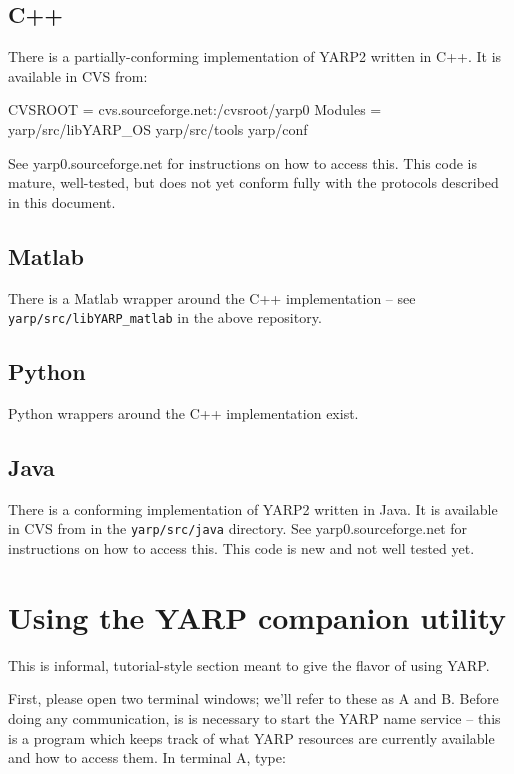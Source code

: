 \documentclass[a4]{article}
\begin{document}
\subsection{C++}

There is a partially-conforming implementation of YARP2 written
in C++.  It is available in CVS from:
\begin{code}
  CVSROOT = cvs.sourceforge.net:/cvsroot/yarp0
  Modules = yarp/src/libYARP_OS yarp/src/tools yarp/conf
\end{code}
See yarp0.sourceforge.net for instructions on how to access this.
This code is mature, well-tested, but does not yet conform fully
with the protocols described in this document.

\subsection{Matlab}

There is a Matlab wrapper around the C++ implementation --
see {\tt yarp/src/libYARP\_matlab} in the above repository.

\subsection{Python}

Python wrappers around the C++ implementation exist.


\subsection{Java}

There is a conforming implementation of YARP2 written in Java.
It is available in CVS from in the {\tt yarp/src/java}
directory.
See yarp0.sourceforge.net for instructions on how to access this.
This code is new and not well tested yet.


\appendix

\section{Using the YARP companion utility}

\label{sect:using-utility}

This is informal, tutorial-style section meant to give the flavor
of using YARP.

First, please
open two terminal windows; we'll refer to these as A and B.
%
Before doing any communication, is is necessary to start the YARP name
service -- this is a program which keeps track of what YARP resources
are currently available and how to access them.
%
In terminal A, type:
\end{document}
